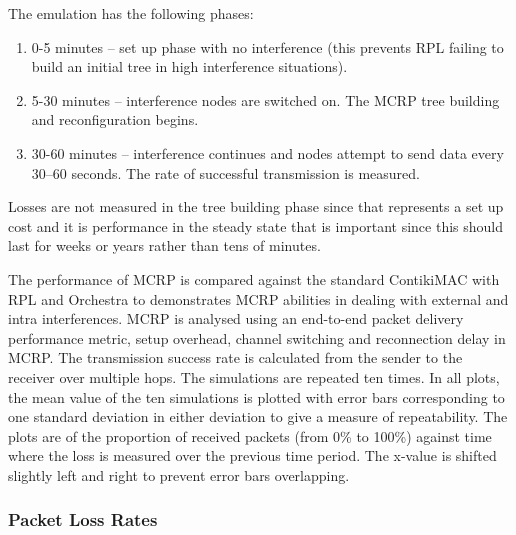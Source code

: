 The emulation has the following phases:
\begin{enumerate}
\item 0-5 minutes -- set up phase with no interference (this prevents RPL failing to build an initial tree in high interference situations).
\item 5-30 minutes -- interference nodes are switched on.  The MCRP tree building and reconfiguration begins.
\item 30-60 minutes -- interference continues and nodes attempt to send data every 30--60 seconds.  The rate of successful transmission is measured.
\end{enumerate}
Losses are not measured in the tree building phase since that represents a set up cost and it is performance in the steady state that is important since this should last for weeks or years rather than tens of minutes.

The performance of MCRP is compared against the standard ContikiMAC with RPL and Orchestra to demonstrates MCRP abilities in dealing with external and intra interferences. 
MCRP is analysed using an end-to-end packet delivery performance metric, setup overhead, channel switching and reconnection delay in MCRP. The transmission success rate is calculated from the sender to the receiver over multiple hops. 
The simulations are repeated ten times. In all plots, the mean value of the ten simulations is plotted with error bars corresponding to one standard deviation in either deviation to give a measure of repeatability. The plots are of the proportion of received packets (from 0\% to 100\%) against time where the loss is measured over the previous time period.  The x-value is shifted slightly left and right to prevent error bars overlapping.

\subsubsection{Packet Loss Rates}


